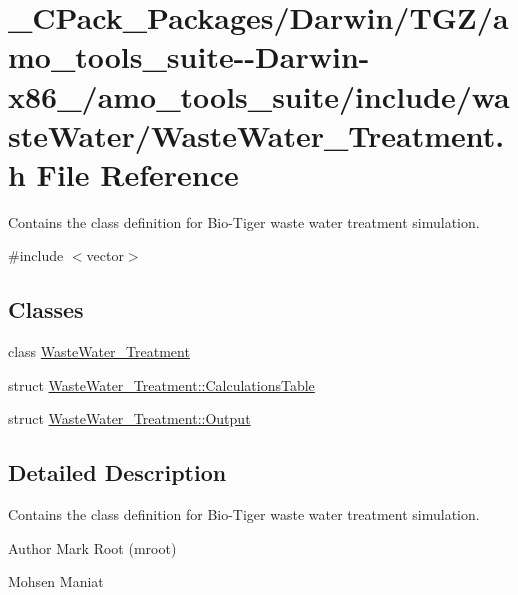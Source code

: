 \hypertarget{___c_pack___packages_2_darwin_2_t_g_z_2amo__tools__suite--_darwin-x86__64_2amo__tools__suite_2in2fd1f126310f68686bc0f0f04dbd7d1b}{}\section{\+\_\+\+C\+Pack\+\_\+\+Packages/\+Darwin/\+T\+G\+Z/amo\+\_\+tools\+\_\+suite-\/-\/\+Darwin-\/x86\+\_/amo\+\_\+tools\+\_\+suite/include/waste\+Water/\+Waste\+Water\+\_\+\+Treatment.h File Reference}
\label{___c_pack___packages_2_darwin_2_t_g_z_2amo__tools__suite--_darwin-x86__64_2amo__tools__suite_2in2fd1f126310f68686bc0f0f04dbd7d1b}


Contains the class definition for Bio-\/\+Tiger waste water treatment simulation.  


{\ttfamily \#include $<$vector$>$}\newline
\subsection*{Classes}
\begin{DoxyCompactItemize}
\item 
class \hyperlink{class_waste_water___treatment}{Waste\+Water\+\_\+\+Treatment}
\item 
struct \hyperlink{struct_waste_water___treatment_1_1_calculations_table}{Waste\+Water\+\_\+\+Treatment\+::\+Calculations\+Table}
\item 
struct \hyperlink{struct_waste_water___treatment_1_1_output}{Waste\+Water\+\_\+\+Treatment\+::\+Output}
\end{DoxyCompactItemize}


\subsection{Detailed Description}
Contains the class definition for Bio-\/\+Tiger waste water treatment simulation. 

\begin{DoxyAuthor}{Author}
Mark Root (mroot) 

Mohsen Maniat 
\end{DoxyAuthor}
